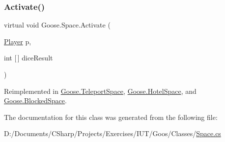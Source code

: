 \subsubsection{\texorpdfstring{Activate()}{Activate()}}
{\footnotesize\ttfamily virtual void Goose.\+Space.\+Activate (\begin{DoxyParamCaption}\item[{\hyperlink{class_goose_1_1_player}{Player}}]{p,  }\item[{int \mbox{[}$\,$\mbox{]}}]{dice\+Result }\end{DoxyParamCaption})\hspace{0.3cm}{\ttfamily [virtual]}}



Reimplemented in \hyperlink{class_goose_1_1_teleport_space_ac85e087a0a946881741b947588a60a8c}{Goose.\+Teleport\+Space}, \hyperlink{class_goose_1_1_hotel_space_a5db408cc238e50b4a592b557b043d3ee}{Goose.\+Hotel\+Space}, and \hyperlink{class_goose_1_1_blocked_space_a08ceb6c567dd3e419f129ac04633f206}{Goose.\+Blocked\+Space}.



The documentation for this class was generated from the following file\+:\begin{DoxyCompactItemize}
\item 
D\+:/\+Documents/\+C\+Sharp/\+Projects/\+Exercises/\+I\+U\+T/\+Goos/\+Classes/\hyperlink{_space_8cs}{Space.\+cs}\end{DoxyCompactItemize}
